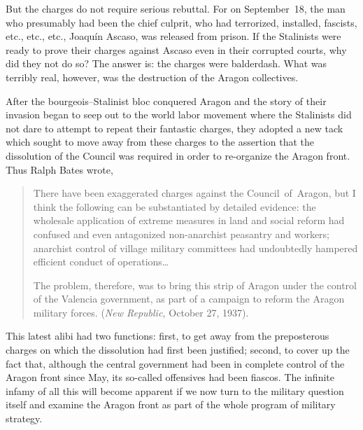But the charges do not require serious rebuttal. For on September~18, the man who presumably had been the chief culprit, who had terrorized, installed, fascists, etc., etc., etc., Joaqu\'in Ascaso, was released from prison. If the Stalinists were ready to prove their charges against Ascaso even in their corrupted courts, why did they not do so? The answer is: the charges were balderdash. What was terribly real, however, was the destruction of the Aragon collectives.

After the bourgeois--Stalinist bloc conquered Aragon and the story of their invasion began to seep out to the world labor movement where the Stalinists did not dare to attempt to repeat their fantastic charges, they adopted a new tack which sought to move away from these charges to the assertion that the dissolution of the Council was required in order to re-organize the Aragon front. Thus Ralph Bates wrote,

\begin{quotation}
  There have been exaggerated charges against the Council~of~Aragon, but I think the following can be substantiated by detailed evidence: the wholesale application of extreme measures in land and social reform had confused and even antagonized non-anarchist peasantry and workers; anarchist control of village military committees had undoubtedly hampered efficient conduct of operations\dots
  
  The problem, therefore, was to bring this strip of Aragon under the control of the Valencia government, as part of a campaign to reform the Aragon military forces. (\emph{New Republic,} October 27, 1937).
\end{quotation}

This latest alibi had two functions: first, to get away from the preposterous charges on which the dissolution had first been justified; second, to cover up the fact that, although the central government had been in complete control of the Aragon front since May, its so-called offensives had been fiascos. The infinite infamy of all this will become apparent if we now turn to the military question itself and examine the Aragon front as part of the whole program of military strategy.